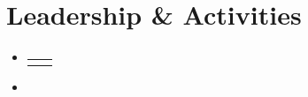 \documentclass[letterpaper,11pt]{article}
\makeatletter
\newcommand{\resumeProjectHeading}[2]{
    \item
    \begin{tabular*}{0.97\textwidth}{l@{\extracolsep{\fill}}r}
      \small#1 & #2 \\
    \end{tabular*}\vspace{-7pt}
}
\newcommand{\resumeSubHeadingListStart}{\begin{itemize}[leftmargin=0.15in, label={}]}
\newcommand{\resumeSubHeadingListEnd}{\end{itemize}}
\makeatother
\begin{document}
\section{Leadership \& Activities}
    \resumeSubHeadingListStart
        \resumeProjectHeading
          {\textbf{\VAR{lead.title}}}{}
          \item {}
    \resumeSubHeadingListEnd

\end{document}
